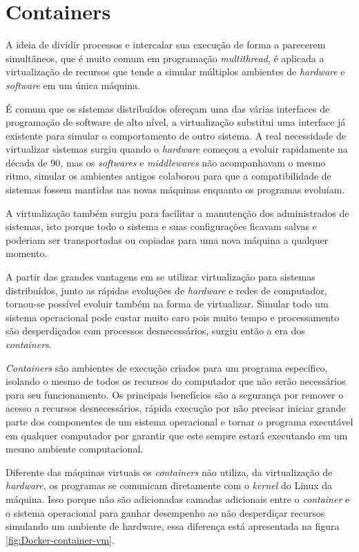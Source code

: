 \section{Containers}
	A ideia de dividir processos e intercalar sua execução de forma a parecerem simultâneos, que é muito comum em programação \textit{multithread}, é aplicada a virtualização de recursos que tende a simular múltiplos ambientes de \textit{hardware} e \textit{software} em um única máquina.
	
	É comum que os sistemas distribuídos ofereçam uma das várias interfaces de programação de software de alto nível, a virtualização substitui uma interface já existente para simular o comportamento de outro sistema. A real necessidade de virtualizar sistemas surgiu quando o \textit{hardware} começou a evoluir rapidamente na década de 90, mas os \textit{softwares} e \textit{middlewares} não acompanhavam o mesmo ritmo, simular os ambientes antigos colaborou para que a compatibilidade de sistemas fossem mantidas nas novas máquinas enquanto os programas evoluíam.
	
	A virtualização também surgiu para facilitar a manutenção dos administrados de sistemas, isto porque todo o sistema e suas configurações ficavam salvas e poderiam ser transportadas ou copiadas para uma nova máquina a qualquer momento.
	
	A partir das grandes vantagens em se utilizar virtualização para sistemas distribuídos, junto as rápidas evoluções de \textit{hardware} e redes de computador, tornou-se possível evoluir também na forma de virtualizar. Simular todo um sistema operacional pode custar muito caro pois muito tempo e processamento são desperdiçados com processos desnecessários, surgiu então a era dos \textit{containers}.
	
	\textit{Containers} são ambientes de execução criados para um programa específico, isolando o mesmo de todos os recursos do computador que não serão necessários para seu funcionamento. Os principais benefícios são a segurança por remover o acesso a recursos desnecessários, rápida execução por não precisar iniciar grande parte dos componentes de um sistema operacional e tornar o programa executável em qualquer computador por garantir que este sempre estará executando em um mesmo ambiente computacional.

	Diferente das máquinas virtuais os \textit{containers} não utiliza, da virtualização de \textit{hardware}, os programas se comunicam diretamente com o \textit{kernel} do Linux da máquina. Isso porque não são adicionadas camadas adicionais entre o \textit{container} e o sistema operacional para ganhar desempenho ao não desperdiçar recursos simulando um ambiente de hardware, essa diferença está apresentada na figura \ref{fig:Docker-container-vm}.

